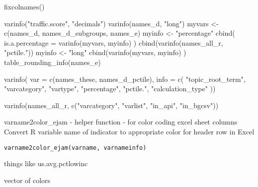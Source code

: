 \documentclass[a4paper]{book}
\begin{document}
%
\begin{SeeAlso}\relax
fixcolnames() 
\end{SeeAlso}
%
\begin{Examples}
\begin{ExampleCode}
 
varinfo("traffic.score", "decimals")
varinfo(names_d, "long")
myvars <- c(names_d, names_d_subgroups, names_e)
myinfo <- "percentage"
cbind(  is.a.percentage = varinfo(myvars, myinfo) )
cbind(varinfo(names_all_r, "pctile."))
myinfo <- "long"
cbind(varinfo(myvars, myinfo) )
table_rounding_info(names_e)
 
varinfo(
 var = c(names_these, names_d_pctile),
 info = c(
 "topic_root_term", "varcategory", "vartype", "percentage", "pctile.", "calculation_type"
))

varinfo(names_all_r, c("varcategory", "varlist", "in_api", "in_bgcsv"))

\end{ExampleCode}
\end{Examples}
%
\begin{Description}\relax
varname2color\_ejam - helper function - for color coding excel sheet columns
Convert R variable name of indicator to appropriate color for header row in Excel
\end{Description}
%
\begin{Usage}
\begin{verbatim}
varname2color_ejam(varname, varnameinfo)
\end{verbatim}
\end{Usage}
%
\begin{Arguments}
\begin{ldescription}
\item[\code{varname}] things like us.avg.pctlowinc
\end{ldescription}
\end{Arguments}
%
\begin{Value}
vector of colors
\end{Value}
%
\begin{SeeAlso}\relax
{}  
\end{SeeAlso}
\end{document}
